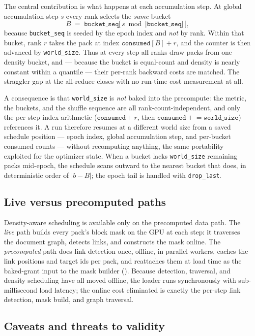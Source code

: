 The central contribution is what happens at each accumulation step. At global
accumulation step $s$ every rank selects the \emph{same} bucket
\[
  B \;=\; \texttt{bucket\_seq}\big[\, s \bmod \lvert \texttt{bucket\_seq}\rvert \,\big],
\]
because \texttt{bucket\_seq} is seeded by the epoch index and \emph{not} by rank.
Within that bucket, rank $r$ takes the pack at index
$\texttt{consumed}[B] + r$, and the counter is then advanced by
\texttt{world\_size}. Thus at every step all ranks draw packs from one density
bucket, and --- because the bucket is equal-count and density is nearly constant
within a quantile --- their per-rank backward costs are matched. The straggler
gap at the all-reduce closes with no run-time cost measurement at all.

A consequence is that \texttt{world\_size} is \emph{not} baked into the
precompute: the metric, the buckets, and the shuffle sequence are all
rank-count-independent, and only the per-step index arithmetic
($\texttt{consumed}+r$, then $\texttt{consumed}\mathrel{+}=\texttt{world\_size}$)
references it. A run therefore resumes at a different world size from a saved
schedule position --- epoch index, global accumulation step, and per-bucket
consumed counts --- without recomputing anything, the same portability exploited
for the optimizer state. When a bucket lacks \texttt{world\_size} remaining packs
mid-epoch, the schedule scans outward to the nearest bucket that does, in
deterministic order of $\lvert b-B\rvert$; the epoch tail is handled with
\texttt{drop\_last}.

\subsection{Live versus precomputed paths}

Density-aware scheduling is available only on the precomputed data path. The
\emph{live} path builds every pack's block mask on the GPU at each step: it
traverses the document graph, detects links, and constructs the mask online. The
\emph{precomputed} path does link detection once, offline, in parallel workers,
caches the link positions and target ids per pack, and reattaches them at load
time as the baked-grant input to the mask builder (). Because
detection, traversal, and density scheduling have all moved offline, the loader
runs synchronously with sub-millisecond load latency; the online cost eliminated
is exactly the per-step link detection, mask build, and graph traversal.

\subsection{Caveats and threats to validity}

